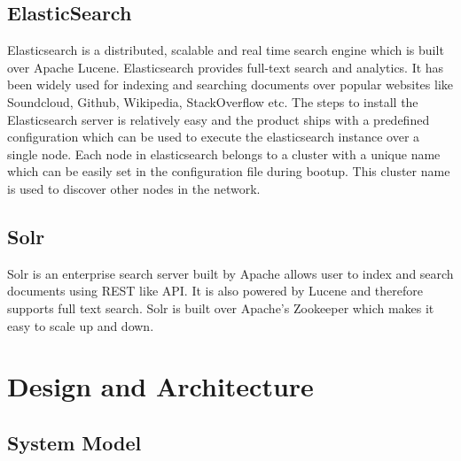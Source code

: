 \documentclass[12pt,a4paper,twoside,openright]{book}
\begin{document}
\section{ElasticSearch}

Elasticsearch \cite{elasticsearch} is a distributed, scalable and real time search engine which is built over Apache Lucene. Elasticsearch provides full-text search and analytics. It has been widely used for indexing and searching documents over popular websites like Soundcloud, Github, Wikipedia, StackOverflow etc. The steps to install the Elasticsearch server is relatively easy and the product ships with a predefined configuration which can be used to execute the elasticsearch instance over a single node. Each node in elasticsearch belongs to a cluster with a unique name which can be easily set in the configuration file during bootup. This cluster name is used to discover other nodes in the network.

\section{Solr}

Solr \cite{solr} is an enterprise search server built by Apache allows user to index and search documents using REST like API. It is also powered by Lucene and therefore supports full text search. Solr is built over Apache's Zookeeper which makes it easy to scale up and down.







\chapter{Design and Architecture}
\label{chap:design}

\section{System Model}
\end{document}
